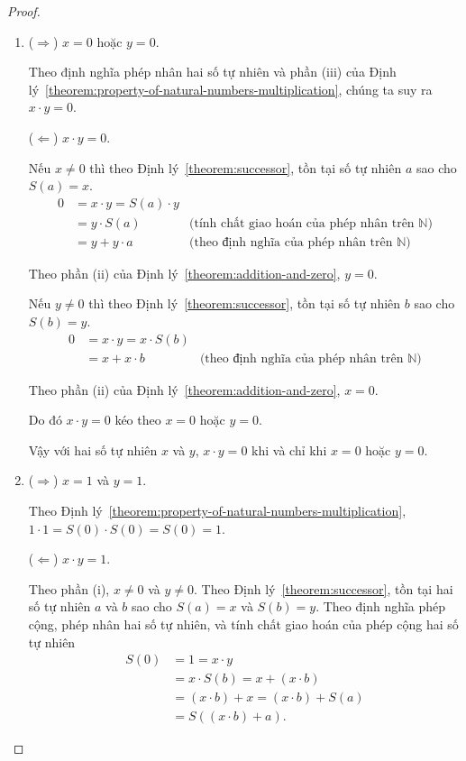 \begin{proof}
	\begin{enumerate}[label={(\roman*)}]
		\item ($\Rightarrow$) $x = 0$ hoặc $y = 0$.

		      Theo định nghĩa phép nhân hai số tự nhiên và phần (iii) của Định lý~\ref{theorem:property-of-natural-numbers-multiplication}, chúng ta suy ra $x\cdot y = 0$.

		      ($\Leftarrow$) $x\cdot y = 0$.

		      Nếu $x\ne 0$ thì theo Định lý~\ref{theorem:successor}, tồn tại số tự nhiên $a$ sao cho $S(a) = x$.
		      \begin{align*}
			      0 & = x\cdot y = S(a)\cdot y                                                                \\
			        & = y\cdot S(a)            & \text{(tính chất giao hoán của phép nhân trên $\mathbb{N}$)} \\
			        & = y + y\cdot a           & \text{(theo định nghĩa của phép nhân trên $\mathbb{N}$)}
		      \end{align*}

		      Theo phần (ii) của Định lý~\ref{theorem:addition-and-zero}, $y = 0$.

		      Nếu $y\ne 0$ thì theo Định lý~\ref{theorem:successor}, tồn tại số tự nhiên $b$ sao cho $S(b) = y$.
		      \begin{align*}
			      0 & = x\cdot y = x\cdot S(b)                                                            \\
			        & = x + x\cdot b           & \text{(theo định nghĩa của phép nhân trên $\mathbb{N}$)}
		      \end{align*}

		      Theo phần (ii) của Định lý~\ref{theorem:addition-and-zero}, $x = 0$.

		      Do đó $x\cdot y = 0$ kéo theo $x = 0$ hoặc $y = 0$.

		      Vậy với hai số tự nhiên $x$ và $y$, $x\cdot y = 0$ khi và chỉ khi $x = 0$ hoặc $y = 0$.
		\item ($\Rightarrow$) $x = 1$ và $y = 1$.

		      Theo Định lý~\ref{theorem:property-of-natural-numbers-multiplication}, $1\cdot 1 = S(0)\cdot S(0) = S(0) = 1$.

		      ($\Leftarrow$) $x\cdot y = 1$.

		      Theo phần (i), $x\ne 0$ và $y\ne 0$. Theo Định lý~\ref{theorem:successor}, tồn tại hai số tự nhiên $a$ và $b$ sao cho $S(a) = x$ và $S(b) = y$. Theo định nghĩa phép cộng, phép nhân hai số tự nhiên, và tính chất giao hoán của phép cộng hai số tự nhiên
		      \begin{align*}
			      S(0) & = 1 = x\cdot y                       \\
			           & = x\cdot S(b) = x + (x\cdot b)       \\
			           & = (x\cdot b) + x = (x\cdot b) + S(a) \\
			           & = S((x\cdot b) + a).
		      \end{align*}


\end{enumerate}
\end{proof}
